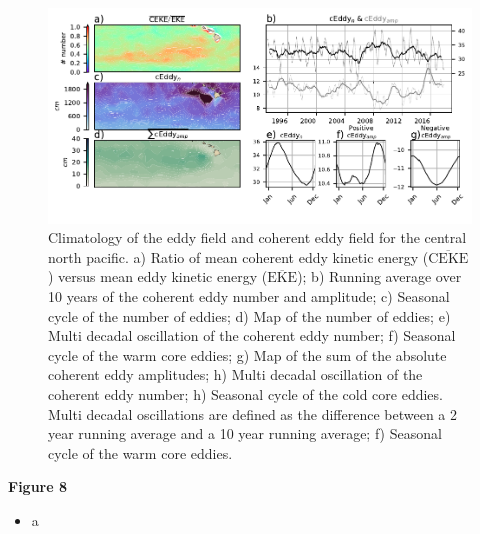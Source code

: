 \documentclass[draft,linenumbers]{agujournal2019}
\newcommand{\MEKE}{\overline{\textrm{EKE}}}
\newcommand{\MCEKE}{\overline{\textrm{CEKE}}}
\begin{document}
	\begin{figure}
	    \centering
	    \includegraphics[width=1\textwidth]{figures/regional_ratios_and_stats_V3_1.pdf}
	    \caption{Climatology of the eddy field and coherent eddy field for the central north pacific. a) Ratio of mean coherent eddy kinetic energy ($\MCEKE$) versus mean eddy kinetic energy ($\MEKE$); b) Running average over 10 years of the coherent eddy number and amplitude; c) Seasonal cycle of the number of eddies; d) Map of the number of eddies; 
		e) Multi decadal oscillation of the coherent eddy number; f) Seasonal cycle of the warm core eddies; g) Map of the sum of the absolute coherent eddy amplitudes;  h) Multi decadal oscillation of the coherent eddy number; h) Seasonal cycle of the cold core eddies. Multi decadal oscillations are defined as the difference between a 2 year running average and a 10 year running average; f) Seasonal cycle of the warm core eddies.}
	    \label{fig:east_tropical_cycle}
	\end{figure}

	\textbf{Figure 8}
	\begin{itemize}
		\item a
	\end{itemize}
\end{document}
